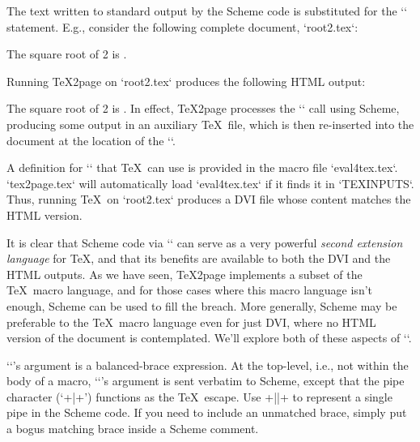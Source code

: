 The text written
to standard output by the Scheme code is substituted
for the `\eval` statement.  E.g., consider the
following complete document, `root2.tex`:

\begintt


The square root of 2 is
.

\bye
\endtt
Running \TeX2page on `root2.tex` produces
the following HTML output:

\quote
The square root of 2 is
.
\endquote
In effect, \TeX2page processes the `\eval` call
using Scheme, producing some output in an auxiliary
\TeX\ file, which is then re-inserted into the document at the location of
the `\eval`.

A definition for `\eval` that \TeX\ can use
is provided in the macro file `eval4tex.tex`.
`tex2page.tex` will automatically load `eval4tex.tex` if it finds it in
`TEXINPUTS`.
Thus, running \TeX\ on
`root2.tex` produces a DVI file whose
content matches the HTML version.


It is clear that Scheme code via `\eval` can serve as
a very powerful {\em second extension language} for
\TeX, and that its benefits are available to both the
DVI and the HTML outputs.  As we have seen, \TeX2page
implements a subset of the \TeX\ macro language, and for
those cases where this macro language isn’t enough,
Scheme can be used to fill the breach.  More generally,
Scheme may be preferable to the \TeX\ macro language even
for just DVI, where no HTML version of the document is
contemplated.  We’ll explore both of these
aspects of `\eval`.

`\eval`’s argument is a balanced-brace
expression.  At the top-level, i.e., not within the body of a macro,
`\eval`’s argument is sent verbatim to Scheme, except that the pipe character
(‘\p+|+’) functions as the \TeX\ escape.  Use \p+||+ to represent a single
pipe in the Scheme code.  If you need to include an unmatched brace, simply
put a bogus matching brace inside a Scheme comment.

